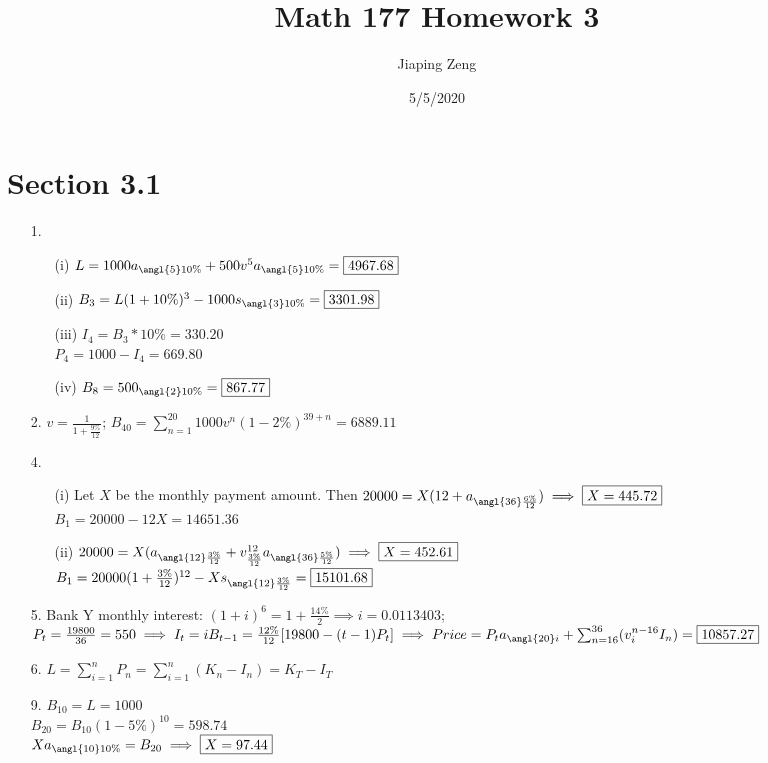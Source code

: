 \documentclass{article}
\title{Math 177 Homework 3}
\date{5/5/2020}
\author{Jiaping Zeng}
\begin{document}
\maketitle

\section*{Section 3.1}
\begin{itemize}
	\item [1.]
	      \begin{itemize}
		      \item [(i)] $L=1000a_{\angl{5}10\%}+500v^5a_{\angl{5}10\%}=\boxed{4967.68}$
		      \item [(ii)] $B_3=L(1+10\%)^3-1000s_{\angl{3}10\%}=\boxed{3301.98}$
		      \item [(iii)] $I_4=B_3*10\%=\boxed{330.20}$\\$P_4=1000-I_4=\boxed{669.80}$
		      \item [(iv)] $B_8=500_{\angl{2}10\%}=\boxed{867.77}$
	      \end{itemize}
	\item [2.] $v=\frac{1}{1+\frac{9\%}{12}}$; $B_{40}=\sum_{n=1}^{20} 1000v^n(1-2\%)^{39+n}=\boxed{6889.11}$
	\item [4.]
	      \begin{itemize}
		      \item [(i)] Let $X$ be the monthly payment amount. Then $20000=X(12+a_{\angl{36}\frac{6\%}{12}}) \implies \boxed{X=445.72}$\\$B_1=20000-12X=\boxed{14651.36}$
		      \item [(ii)] $20000=X(a_{\angl{12}\frac{3\%}{12}}+v_{\frac{3\%}{12}}^{12}a_{\angl{36}\frac{5\%}{12}}) \implies \boxed{X=452.61}$\\$B_1=20000(1+\frac{3\%}{12})^{12}-Xs_{\angl{12}\frac{3\%}{12}}=\boxed{15101.68}$
	      \end{itemize}
	\item [5.] Bank Y monthly interest: $(1+i)^6=1+\frac{14\%}{2} \implies i=0.0113403$; $P_t=\frac{19800}{36}=550 \implies I_t=iB_{t-1}=\frac{12\%}{12}[19800-(t-1)P_t]\implies Price=P_ta_{\angl{20}i}+\sum_{n=16}^{36}(v_i^{n-16}I_n)=\boxed{10857.27}$
	\item [6.] $L=\sum_{i=1}^nP_n=\sum_{i=1}^n(K_n-I_n)=K_T-I_T$
	\item [9.] $B_{10}=L=1000$\\$B_{20}=B_{10}(1-5\%)^{10}=598.74$\\$Xa_{\angl{10}10\%}=B_{20} \implies \boxed{X=97.44}$

\end{itemize}
\end{document}
